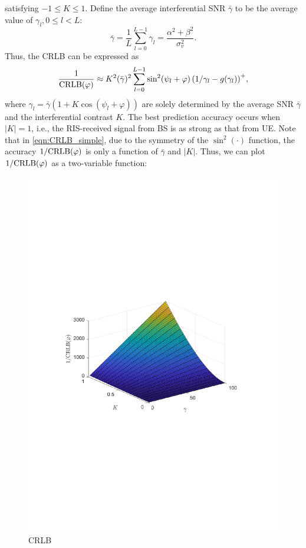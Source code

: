 \documentclass[12pt,draftclsnofoot,journal,onecolumn]{IEEEtran}
\theoremstyle{nonumberplain}
\begin{document}
    satisfying $-1\leq K\leq 1$. Define the average interferential SNR $\bar{\gamma}$ to be the  average value of $\gamma_l, 0\leq l < L$:
    \begin{equation}
        \bar{\gamma} = \frac{1}{L}\sum_{l=0}^{L-1}{\gamma_l} = \frac{\alpha^2+\beta^2}{\sigma_v^2}.
    \end{equation}
    Thus, the CRLB can be expressed as 
    \begin{equation}
        \frac{1}{{\rm CRLB}(\varphi)} \approx K^2(\bar{\gamma})^2 \sum_{l=0}^{L-1}{ \sin^2(\psi_l+\varphi) \left(1/\gamma_l-g(\gamma_l)\right)^{+} },
        \label{eqn:CRLB_simple}
    \end{equation}
    where $\gamma_l=\bar{\gamma}\left(1+K\cos(\psi_l+\varphi)\right)$ are solely determined by the average SNR $\bar{\gamma}$ and the interferential contrast $K$. The best prediction accuracy occurs when $\lvert K \rvert = 1$, i.e., the RIS-received signal from BS is as strong as that from UE. Note that in \eqref{eqn:CRLB_simple}, due to the symmetry of the $\sin^2(\cdot)$ function, the accuracy $1/{\rm CRLB}(\varphi)$ is only a function of $\bar{\gamma}$ and $\lvert K \rvert$. Thus, we can plot $1/{\rm CRLB}(\varphi)$ as a two-variable function:
    \begin{figure}[!h]
        \centering
        \includegraphics[width=14cm]{figures/crlb.pdf}
        \caption{CRLB}
    \end{figure}
\end{document}
